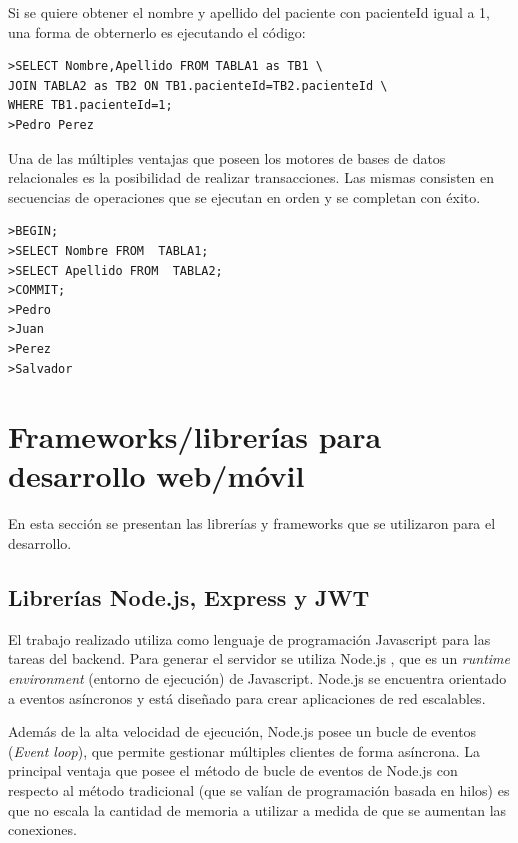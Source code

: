 Si se quiere obtener el nombre y apellido del paciente con pacienteId igual a 1, una forma de obternerlo es ejecutando el código:

\begin{lstlisting}[label=código:SQL:vControl,caption=Ejecución de comando sql]  
>SELECT Nombre,Apellido FROM TABLA1 as TB1 \
JOIN TABLA2 as TB2 ON TB1.pacienteId=TB2.pacienteId \
WHERE TB1.pacienteId=1;
>Pedro Perez
\end{lstlisting}

Una de las múltiples ventajas que poseen los motores de bases de datos relacionales es la posibilidad de realizar transacciones. Las mismas consisten en secuencias de operaciones que se ejecutan en orden y se completan con éxito.

\begin{lstlisting}[label=código:SQL2:vControl,caption=Secuencia de transacción SQL.]  
>BEGIN;
>SELECT Nombre FROM  TABLA1;
>SELECT Apellido FROM  TABLA2;
>COMMIT;
>Pedro 
>Juan
>Perez
>Salvador
\end{lstlisting}




\pagebreak
\section{Frameworks/librerías para desarrollo web/móvil}

En esta sección se presentan las librerías y frameworks que se utilizaron para el desarrollo.

\subsection{Librerías Node.js, Express y JWT}
\label{subsec: Node}
El trabajo realizado utiliza como lenguaje de programación  Javascript para las tareas del backend. Para generar el servidor se utiliza Node.js \citep{WEBSITE:20}, que es un \textit{runtime environment} (entorno de ejecución) de Javascript. Node.js se encuentra orientado a eventos asíncronos y está diseñado para crear aplicaciones de red escalables.

Además de la alta velocidad de ejecución, Node.js posee un bucle de eventos (\textit{Event loop}), que permite gestionar múltiples clientes de forma asíncrona. La principal ventaja que posee el método de bucle de eventos de Node.js con respecto al método tradicional (que se valían de programación basada en hilos) es que no escala la cantidad de memoria a utilizar a medida de que se aumentan las conexiones.

